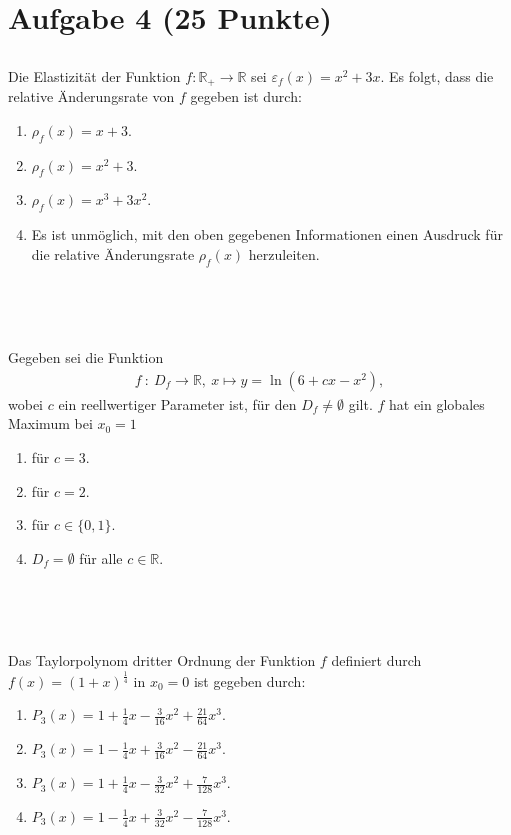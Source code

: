 \newpage

\section*{Aufgabe 4 (25 Punkte)}
\vspace{0.4cm}
\subsection*{}
Die Elastizität der Funktion $f : \mathbb{R}_+ \to \mathbb{R}$
sei $\varepsilon_{f}(x) = x^2 + 3x$.
Es folgt, dass die relative Änderungsrate von $f$ gegeben ist durch:
\renewcommand{\labelenumi}{(\alph{enumi})}
\begin{enumerate}
\item $\rho_f(x) = x+3$.
\item $\rho_f(x) = x^2 + 3$.
\item $\rho_f(x) = x^3 + 3x^2$.
\item Es ist unmöglich, mit den oben gegebenen Informationen einen Ausdruck für die relative Änderungsrate $\rho_f(x)$ herzuleiten.
\end{enumerate}
\ \\
\\
\subsection*{}
Gegeben sei die Funktion
\begin{align*}
f \ : \ D_f \to \mathbb{R}, \ x \mapsto y = \ln(6 +cx -x^2)	,
\end{align*}
wobei $c$ ein reellwertiger Parameter ist, für den $D_f \neq \emptyset$ gilt.
$f$ hat ein globales Maximum bei $x_0=1$
\renewcommand{\labelenumi}{(\alph{enumi})}
\begin{enumerate}
\item für $c=3$.
\item für $c = 2$.
\item für $c \in \lbrace 0, 1\rbrace$.
\item $D_f = \emptyset $ für alle $c \in \mathbb{R}$.
\end{enumerate}
\ \\
\\
\subsection*{}
Das Taylorpolynom dritter Ordnung der Funktion $f$ definiert durch 
$f(x) = (1+x)^{\frac{1}{4}}$ in $x_0 = 0$ ist gegeben durch:
\begin{enumerate}
\item $P_3(x) = 1 + \frac{1}{4} x - \frac{3}{16}x^2 +\frac{21}{64}x^3$.
\item $P_3(x) = 1 -\frac{1}{4} x + \frac{3}{16}x^2 - \frac{21}{64}x^3$.
\item $P_3(x) = 1 +\frac{1}{4} x - \frac{3}{32}x^2 + \frac{7}{128}x^3$.
\item $P_3(x) = 1 -\frac{1}{4} x + \frac{3}{32}x^2 - \frac{7}{128}x^3$.
\end{enumerate}
\ \\
\ \\
